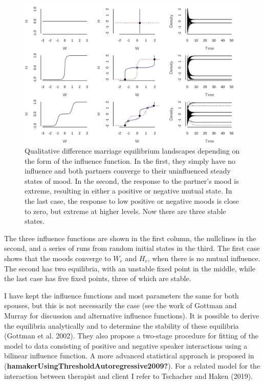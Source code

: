 \documentclass[
  a4paper,
  DIV=11,
  numbers=noendperiod,
  oneside]{scrreprt}
\begin{document}
\begin{figure}

{\centering \includegraphics{media/ch4n/fig-ch4n-img10-old-58.png}

}

\caption{\label{fig-ch4n-img10-old-58}Qualitative difference marriage
equilibrium landscapes depending on the form of the influence function.
In the first, they simply have no influence and both partners converge
to their uninfluenced steady states of mood. In the second, the response
to the partner's mood is extreme, resulting in either a positive or
negative mutual state. In the last case, the response to low positive or
negative moods is close to zero, but extreme at higher levels. Now there
are three stable states.}

\end{figure}

The three influence functions are shown in the first column, the
nullclines in the second, and a series of runs from random initial
states in the third. The first case shows that the moods converge to
\(W_{e}\) and \(H_{e}\), when there is no mutual influence. The second
has two equilibria, with an unstable fixed point in the middle, while
the last case has five fixed points, three of which are stable.

I have kept the influence functions and most parameters the same for
both spouses, but this is not necessarily the case (see the work of
Gottman and Murray for discussion and alternative influence functions).
It is possible to derive the equilibria analytically and to determine
the stability of these equilibria (Gottman et al. 2002). They also
propose a two-stage procedure for fitting of the model to data
consisting of positive and negative speaker interactions using a
bilinear influence function. A more advanced statistical approach is
proposed in (\textbf{hamakerUsingThresholdAutoregressive2009?}). For a
related model for the interaction between therapist and client I refer
to Tschacher and Haken (2019).
\end{document}
